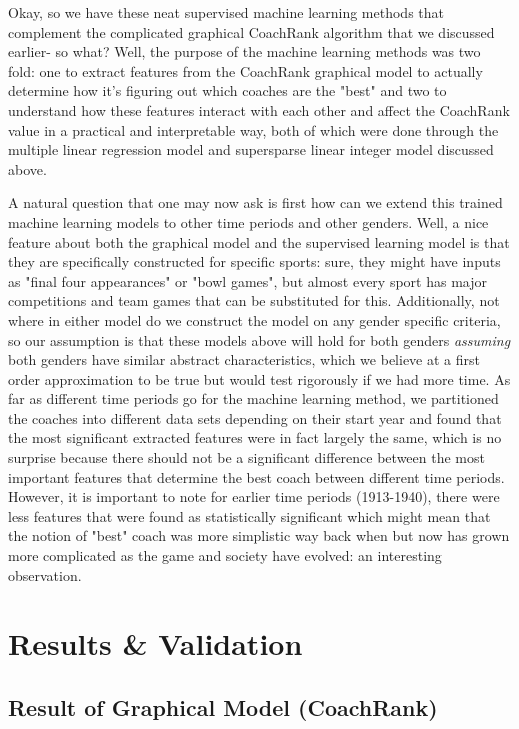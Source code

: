 \documentclass[11pt,notitlepage]{article}
\begin{document}
\noindent Okay, so we have these neat supervised machine learning methods that complement the complicated graphical CoachRank algorithm that we discussed earlier- so what? Well, the purpose of the machine learning methods was two fold: one to extract features from the CoachRank graphical model to actually determine how it's figuring out which coaches are the "best" and two to understand how these features interact with each other and affect the CoachRank value in a practical and interpretable way, both of which were done through the multiple linear regression model and supersparse linear integer model discussed above.  

\vspace{2 mm}

\noindent A natural question that one may now ask is first how can we extend this trained machine learning models to other time periods and other genders. Well, a nice feature about both the graphical model and the supervised learning model is that they are specifically constructed for specific sports: sure, they might have inputs as "final four appearances" or "bowl games", but almost every sport has major competitions and team games that can be substituted for this. Additionally, not where in either model do we construct the model on any gender specific criteria, so our assumption is that these models above will hold for both genders \textit{assuming} both genders have similar abstract characteristics, which we believe at a first order approximation to be true but would test rigorously if we had more time. As far as different time periods go for the machine learning method, we partitioned the coaches into different data sets depending on their start year and found that the most significant extracted features were in fact largely the same, which is no surprise because there should not be a significant difference between the most important features that determine the best coach between different time periods. However, it is important to note for earlier time periods (1913-1940), there were less features that were found as statistically significant which might mean that the notion of "best" coach was more simplistic way back when but now has grown more complicated as the game and society have evolved: an interesting observation.    


\section{Results \& Validation}

\subsection{Result of Graphical Model (CoachRank)}
\end{document}
